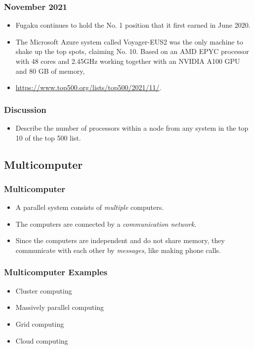 \documentclass{beamer}
\begin{document}
\begin{CJK}{UTF8}{bsmi}
  \begin{frame}
    \frametitle{November 2021}
    \begin{itemize}
    \item Fugaku continues to hold the No. 1 position that it first
      earned in June 2020.
    \item The Microsoft Azure system called Voyager-EUS2 was the only
      machine to shake up the top spots, claiming No. 10. Based on an
      AMD EPYC processor with 48 cores and 2.45GHz working together
      with an NVIDIA A100 GPU and 80 GB of memory,
    \item \url{https://www.top500.org/lists/top500/2021/11/}.
    \end{itemize}
  \end{frame}

  \begin{frame}
    \frametitle{Discussion} 
    \begin{itemize}
    \item Describe the number of processors within a node from any system
      in the top 10 of the top 500 list.
    \end{itemize}
  \end{frame}


  \subsection{Multicomputer}

  \begin{frame}
    \frametitle{Multicomputer} 
    \begin{itemize}
    \item A parallel system consists of {\em multiple} computers.
    \item The computers are connected by a {\em communication network}.
    \item Since the computers are independent and do not share memory,
      they communicate with each other by {\em messages}, like making
      phone calls.
    \end{itemize}
  \end{frame}

  \begin{frame}
    \frametitle{Multicomputer Examples} 
    \begin{itemize}
    \item Cluster computing
    \item Massively parallel computing
    \item Grid computing
    \item Cloud computing
    \end{itemize}
  \end{frame}




\end{CJK}
\end{document}

